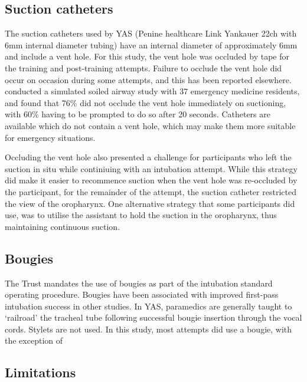 \documentclass[]{article}
\begin{document}
\hypertarget{suction-catheters}{%
\subsection{Suction catheters}\label{suction-catheters}}

The suction catheters used by YAS (Penine healthcare Link Yankauer 22ch
with 6mm internal diameter tubing) have an internal diameter of
approximately 6mm and include a vent hole. For this study, the vent hole
was occluded by tape for the training and post-training attempts.
Failure to occlude the vent hole did occur on occasion during some
attempts, and this has been reported elsewhere.
\citet{cox_yankauer_2017} conducted a simulated soiled airway study with
37 emergency medicine residents, and found that 76\% did not occlude the
vent hole immediately on suctioning, with 60\% having to be prompted to
do so after 20 seconds. Catheters are available which do not contain a
vent hole, which may make them more suitable for emergency situations.

Occluding the vent hole also presented a challenge for participants who
left the suction in situ while continiuing with an intubation attempt.
While this strategy did make it easier to recommence suction when the
vent hole was re-occluded by the participant, for the remainder of the
attempt, the suction catheter restricted the view of the oropharynx. One
alternative strategy that some participants did use, was to utilise the
assistant to hold the suction in the oropharynx, thus maintaining
continuous suction.

\hypertarget{bougies}{%
\subsection{Bougies}\label{bougies}}

The Trust mandates the use of bougies as part of the intubation standard
operating procedure. Bougies have been associated with improved
first-pass intubation success
\citep{kingma_comparison_2017, driver_bougie_2017} in other studies. In
YAS, paramedics are generally taught to `railroad' the tracheal tube
following successful bougie insertion through the vocal cords. Stylets
are not used. In this study, most attempts did use a bougie, with the
exception of

\hypertarget{limitations}{%
\subsection{Limitations}\label{limitations}}
\end{document}
